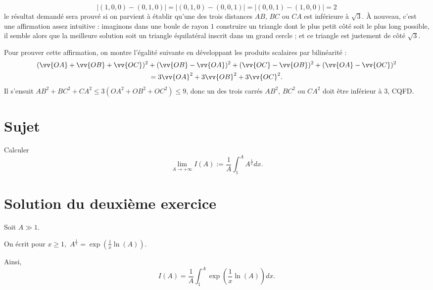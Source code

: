 \begin{enumerate}
\[\lvert(1,0,0) - (0,1,0)\rvert = \lvert(0,1,0) - (0,0,1)\rvert = \lvert(0,0,1) - (1,0,0)\rvert = 2\] le résultat demandé sera prouvé si on parvient à établir qu'une des trois distances $AB$, $BC$ ou $CA$ est inférieure à $\sqrt 3$. À nouveau, c'est une affirmation assez intuitive : imaginons dans une boule de rayon $1$ construire un triangle dont le plus petit côté soit le plus long possible, il semble alors que la meilleure solution soit un triangle équilatéral inscrit dans un grand cercle ; et ce triangle est justement de côté $\sqrt 3$.

\begin{center}
\end{center}
Pour prouver cette affirmation, on montre l'égalité suivante en développant les produits scalaires par bilinéarité :
\begin{multline*}
    (\vv{OA} + \vv{OB} + \vv{OC})^2 + (\vv{OB} - \vv{OA})^2 + (\vv{OC} - \vv{OB})^2 + (\vv{OA} - \vv{OC})^2 \\= 3\vv{OA}^2 + 3 \vv{OB}^2 + 3\vv{OC}^2.
\end{multline*}
Il s'ensuit $AB^2 + BC^2 + CA^2 \leqslant 3(OA^2 + OB^2 + OC^2) \leqslant 9$, donc un des trois carrés $AB^2$, $BC^2$ ou $CA^2$ doit être inférieur à $3$, CQFD.
\end{enumerate}

\section{Sujet}

Calculer $$\lim_{A\rightarrow +\infty}I(A):=\frac{1}{A}\int_{1}^{A}A^{\frac{1}{x}}dx.$$

\section{Solution du deuxième exercice}

Soit $A\gg 1.$

On écrit pour $x\geq 1,$ $\displaystyle A^{\frac{1}{x}}=\exp(\frac{1}{x}\ln(A)).$

Ainsi, $$I(A)=\frac{1}{A}\int_{1}^{A}\exp(\frac{1}{x}\ln(A))dx.$$

